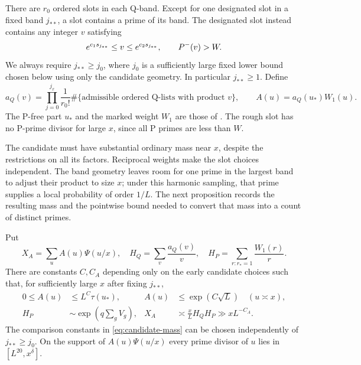 There are $r_0$ ordered slots in each Q-band. Except for one designated
slot in a fixed band $j_{**}$, a slot contains a prime of its band. The
designated slot instead contains any integer $v$ satisfying
\[
 e^{c_1s_{j_{**}}}\le v\le e^{c_2s_{j_{**}}},\qquad P^{-}(v)>W.
\]
We always require $j_{**}\ge j_0$, where $j_0$ is a sufficiently large
fixed lower bound chosen below using only the candidate geometry.
In particular $j_{**}\ge1$. Define
\[
 a_Q(v)=\prod_{j=0}^{j_x}\frac1{r_0!}
       \#\{\text{admissible ordered Q-lists with product }v\},
 \qquad A(u)=a_Q(u_*)W_1(u).
\]
The P-free part $u_*$ and the marked weight $W_1$ are those of
. The rough slot has no P-prime divisor for large $x$,
since all P primes are less than $W$.

The candidate must have substantial ordinary mass near $x$, despite
the restrictions on all its factors. Reciprocal weights make the slot
choices independent. The band geometry leaves room for one prime in
the largest band to adjust their product to size $x$; under this
harmonic sampling, that prime supplies a local probability of order
$1/L$. The next proposition records the resulting mass and the
pointwise bound needed to convert that mass into a count of distinct
primes.

\begin{proposition}\label{prop:candidate-mass}
Put
\[
 X_A=\sum_u A(u)\Psi(u/x),\quad
 H_Q=\sum_v\frac{a_Q(v)}v,\quad
 H_P=\sum_{r:r_*=1}\frac{W_1(r)}r.
\]
There are constants $C,C_A$ depending only on the early candidate
choices such that, for sufficiently large $x$ after fixing $j_{**}$,
\begin{align}
 0\le A(u)&\le L^C\tau(u_*),
 & A(u)&\le\exp(C\sqrt L)\quad(u\asymp x),\label{eq:candidate-pointwise}\\
 H_P&\sim\exp\left(q\sum_g V_g\right),
 & X_A&\asymp\frac{x}{L}H_QH_P\gg xL^{-C_A}.
 \label{eq:candidate-mass}
\end{align}
The comparison constants in \eqref{eq:candidate-mass} can be chosen
independently of $j_{**}\ge j_0$. On the support of
$A(u)\Psi(u/x)$ every prime divisor of $u$ lies in $[L^{20},x^\delta]$.
\end{proposition}

